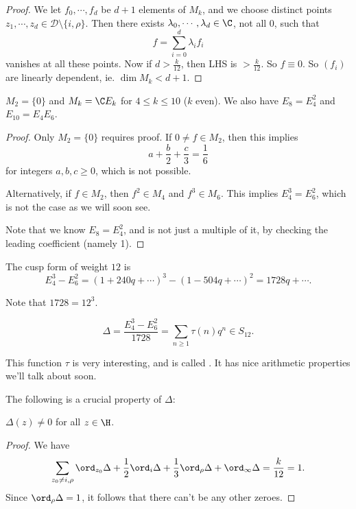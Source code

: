 \documentclass[a4paper]{article}
\begin{document}
\begin{proof}
  We let $f_0, \cdots, f_d$ be $d + 1$ elements of $M_k$, and we choose distinct points $z_1, \cdots, z_d \in \mathcal{D} \setminus \{i, \rho\}$. Then there exists $\lambda_0, \cdots, \lambda_d \in \C$, not all $0$, such that
  \[
    f = \sum_{i = 0}^d \lambda_i f_i
  \]
  vanishes at all these points. Now if $d > \frac{k}{12}$, then LHS is $> \frac{k}{12}$. So $f \equiv 0$. So $(f_i)$ are linearly dependent, ie. $\dim M_k < d + 1$.
\end{proof}

\begin{cor}\leavevmode
  $M_2 = \{0\}$ and $M_k = \C E_k$ for $4 \leq k \leq 10$ ($k$ even). We also have $E_8 = E_4^2$ and $E_{10} = E_4 E_6$.
\end{cor}

\begin{proof}
  Only $M_2 = \{0\}$ requires proof. If $0 \not= f \in M_2$, then this implies
  \[
    a + \frac{b}{2} + \frac{c}{3} = \frac{1}{6}
  \]
  for integers $a, b, c \geq 0$, which is not possible.

  Alternatively, if $f \in M_2$, then $f^2 \in M_4$ and $f^3 \in M_6$. This implies $E_4^3 = E_6^2$, which is not the case as we will soon see.

  Note that we know $E_8 = E_4^2$, and is not just a multiple of it, by checking the leading coefficient (namely 1).
\end{proof}

\begin{cor}
  The cusp form of weight $12$ is
  \[
    E_4^3 - E_6^2 = (1 + 240 q + \cdots)^3 - (1 - 504 q + \cdots)^2 = 1728q + \cdots.
  \]
\end{cor}
Note that $1728 = 12^3$.

\begin{defi}\index{$\Delta$}
  \[
    \Delta = \frac{E_4^3 - E_6^2}{1728} = \sum_{n \geq 1} \tau(n) q^n \in S_{12}.
  \]
\end{defi}
This function $\tau$ is very interesting, and is called . It has nice arithmetic properties we'll talk about soon.

The following is a crucial property of $\Delta$:
\begin{prop}
  $\Delta(z) \not= 0$ for all $z \in \H$.
\end{prop}

\begin{proof}
  We have
  \[
    \sum_{z_0 \not= i, \rho} \ord_{z_0} \Delta + \frac{1}{2} \ord_i \Delta + \frac{1}{3} \ord_\rho \Delta + \ord_\infty \Delta = \frac{k}{12} = 1.
  \]
  Since $\ord_\rho \Delta = 1$, it follows that there can't be any other zeroes.
\end{proof}
\end{document}
